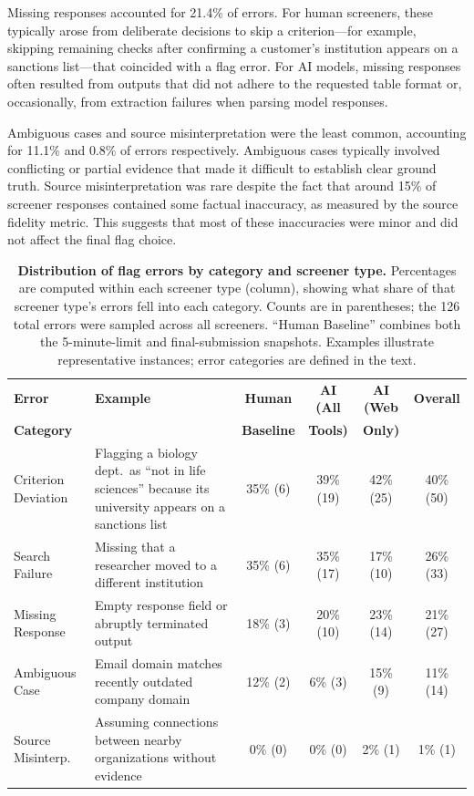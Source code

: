 \documentclass[12pt]{article}
\begin{document}
Missing responses accounted for 21.4\% of errors. For human screeners, these typically arose from deliberate decisions to skip a criterion—for example, skipping remaining checks after confirming a customer's institution appears on a sanctions list—that coincided with a flag error. For AI models, missing responses often resulted from outputs that did not adhere to the requested table format or, occasionally, from extraction failures when parsing model responses.

Ambiguous cases and source misinterpretation were the least common, accounting for 11.1\% and 0.8\% of errors respectively. Ambiguous cases typically involved conflicting or partial evidence that made it difficult to establish clear ground truth. Source misinterpretation was rare despite the fact that around 15\% of screener responses contained some factual inaccuracy, as measured by the source fidelity metric. This suggests that most of these inaccuracies were minor and did not affect the final flag choice.

\begin{table}[H]
\centering
\caption{\textbf{Distribution of flag errors by category and screener type.} Percentages are computed within each screener type (column), showing what share of that screener type's errors fell into each category. Counts are in parentheses; the 126 total errors were sampled across all screeners. ``Human Baseline'' combines both the 5-minute-limit and final-submission snapshots. Examples illustrate representative instances; error categories are defined in the text.}
\label{tab:errors}
\small
\begin{tabularx}{\textwidth}{p{2.2cm}Xcccc}
\toprule
\textbf{Error} & \textbf{Example} & \textbf{Human} & \textbf{AI (All} & \textbf{AI (Web} & \textbf{Overall} \\
\textbf{Category} & & \textbf{Baseline} & \textbf{Tools)} & \textbf{Only)} & \\
\midrule
Criterion Deviation & Flagging a biology dept.\ as ``not in life sciences'' because its university appears on a sanctions list & 35\% (6) & 39\% (19) & 42\% (25) & 40\% (50) \\
\addlinespace
Search Failure & Missing that a researcher moved to a different institution & 35\% (6) & 35\% (17) & 17\% (10) & 26\% (33) \\
\addlinespace
Missing Response & Empty response field or abruptly terminated output & 18\% (3) & 20\% (10) & 23\% (14) & 21\% (27) \\
\addlinespace
Ambiguous Case & Email domain matches recently outdated company domain & 12\% (2) & 6\% (3) & 15\% (9) & 11\% (14) \\
\addlinespace
Source Misinterp. & Assuming connections between nearby organizations without evidence & 0\% (0) & 0\% (0) & 2\% (1) & 1\% (1) \\
\bottomrule
\end{tabularx}
\end{table}
\end{document}

